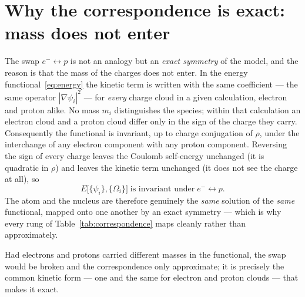 \documentclass[11pt]{article}
\begin{document}
\section{Why the correspondence is exact: mass does not enter}
\label{sec:mass}

The swap $e^-\!\leftrightarrow p$ is not an analogy but an \emph{exact symmetry} of the model, and the
reason is that the mass of the charges does not enter. In the energy
functional~\eqref{eq:energy} the kinetic term is written with the same coefficient --- the same
operator $|\nabla\psi_i|^2$ --- for \emph{every} charge cloud in a given calculation, electron and
proton alike. No mass $m_i$ distinguishes the species; within that calculation an electron cloud and a
proton cloud differ only in the sign of the charge they carry. Consequently the functional is invariant, up to charge conjugation of $\rho$, under the
interchange of any electron component with any proton component. Reversing the sign of every charge
leaves the Coulomb self-energy unchanged (it is quadratic in $\rho$) and leaves the kinetic term
unchanged (it does not see the charge at all), so
\begin{equation}
E\big[\{\psi_i\},\{\Omega_i\}\big] \;\text{is invariant under}\; e^-\!\leftrightarrow p .
\end{equation}
The atom and the nucleus are therefore genuinely the \emph{same} solution of the \emph{same} functional,
mapped onto one another by an exact symmetry --- which is why every rung of Table~\ref{tab:correspondence}
maps cleanly rather than approximately.

Had electrons and protons carried different masses in the functional, the swap would be broken and the
correspondence only approximate; it is precisely the common kinetic form --- one and the same for
electron and proton clouds --- that makes it exact.
\end{document}
